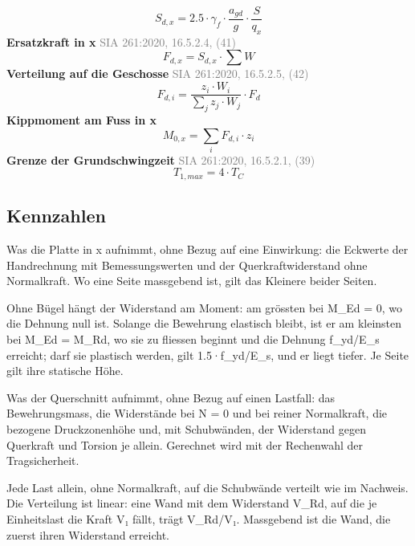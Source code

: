 \documentclass[11pt,a4paper]{article}
\newcommand{\normref}[1]{{\small\textcolor{gray}{#1}}}
\begin{document}
\begin{equation*}
S_{d,x} = 2.5 \cdot \gamma_f \cdot \frac{a_{gd}}{g} \cdot \frac{S}{q_x}
\end{equation*}
\noindent\textbf{Ersatzkraft in x} \hfill \normref{SIA 261:2020, 16.5.2.4, (41)}
\begin{equation*}
F_{d,x} = S_{d,x} \cdot \sum W
\end{equation*}
\noindent\textbf{Verteilung auf die Geschosse} \hfill \normref{SIA 261:2020, 16.5.2.5, (42)}
\begin{equation*}
F_{d,i} = \frac{z_i \cdot W_i}{\sum_j z_j \cdot W_j} \cdot F_d
\end{equation*}
\noindent\textbf{Kippmoment am Fuss in x}
\begin{equation*}
M_{0,x} = \sum_i F_{d,i} \cdot z_i
\end{equation*}
\noindent\textbf{Grenze der Grundschwingzeit} \hfill \normref{SIA 261:2020, 16.5.2.1, (39)}
\begin{equation*}
T_{1,max} = 4 \cdot T_C
\end{equation*}
\subsection{Kennzahlen}
Was die Platte in x aufnimmt, ohne Bezug auf eine Einwirkung: die Eckwerte der Handrechnung mit Bemessungswerten und der Querkraftwiderstand ohne Normalkraft. Wo eine Seite massgebend ist, gilt das Kleinere beider Seiten.

Ohne Bügel hängt der Widerstand am Moment: am grössten bei M\_Ed = 0, wo die Dehnung null ist. Solange die Bewehrung elastisch bleibt, ist er am kleinsten bei M\_Ed = M\_Rd, wo sie zu fliessen beginnt und die Dehnung f\_yd/E\_s erreicht; darf sie plastisch werden, gilt 1.5·f\_yd/E\_s, und er liegt tiefer. Je Seite gilt ihre statische Höhe.

Was der Querschnitt aufnimmt, ohne Bezug auf einen Lastfall: das Bewehrungsmass, die Widerstände bei N = 0 und bei reiner Normalkraft, die bezogene Druckzonenhöhe und, mit Schubwänden, der Widerstand gegen Querkraft und Torsion je allein. Gerechnet wird mit der Rechenwahl der Tragsicherheit.

Jede Last allein, ohne Normalkraft, auf die Schubwände verteilt wie im Nachweis. Die Verteilung ist linear: eine Wand mit dem Widerstand V\_Rd, auf die je Einheitslast die Kraft V₁ fällt, trägt V\_Rd/V₁. Massgebend ist die Wand, die zuerst ihren Widerstand erreicht.
\end{document}
